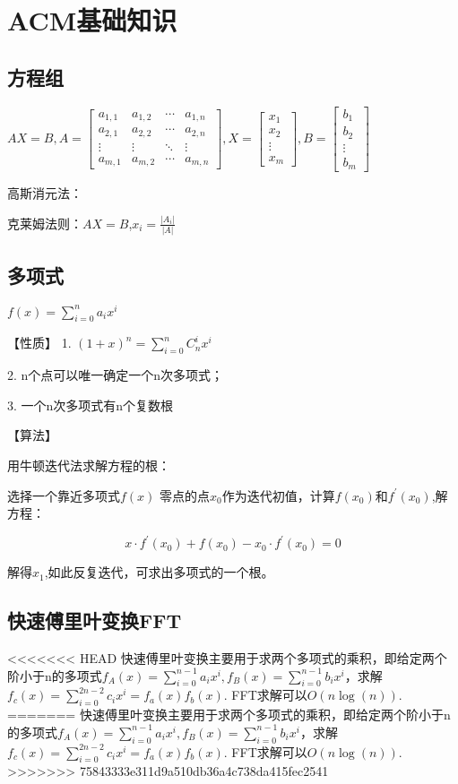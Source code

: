 \chapter{ACM基础知识}
\section{方程组}

$AX=B, A=\begin{bmatrix}
	a_{1,1} & a_{1,2} & \cdots & a_{1,n} \\
	a_{2,1} & a_{2,2} & \cdots & a_{2,n} \\
	\vdots  & \vdots  & \ddots & \vdots  \\
	a_{m,1} & a_{m,2} & \cdots & a_{m,n}
\end{bmatrix}, 
X=\begin{bmatrix}
x_{1}  \\
x_{2} \\
\vdots   \\
x_{m}
\end{bmatrix}, 
B=\begin{bmatrix}
b_{1}  \\
b_{2} \\
\vdots   \\
b_{m}
\end{bmatrix}$

高斯消元法：

克莱姆法则：$AX=B$,$x_i=\frac{|A_i|}{|A|}$

\section{多项式}
$f(x)=\sum_{i=0}^n{a_ix^i}$

【性质】
1. $(1+x)^n=\sum_{i=0}^n{C_n^ix^i}$

2. n个点可以唯一确定一个n次多项式；

3. 一个n次多项式有n个复数根

【算法】

用牛顿迭代法求解方程的根：

选择一个靠近多项式$f(x)$ 零点的点$x_0$作为迭代初值，计算$f(x_0)$和$f^{'}(x_0)$,解方程：

$$x\cdot f^{'}(x_0)+f(x_0)-x_0\cdot f^{'}(x_0)=0$$

解得$x_1$,如此反复迭代，可求出多项式的一个根。

\section{快速傅里叶变换FFT}
<<<<<<< HEAD
快速傅里叶变换主要用于求两个多项式的乘积，即给定两个阶小于n的多项式$f_{A}(x)=\sum_{i=0}^{n-1}{a_ix^i},f_{B}(x)=\sum_{i=0}^{n-1}{b_ix^i}$，求解$f_{c}(x)=\sum_{i=0}^{2n-2}{c_ix^i}=f_{a}(x)f_{b}(x)$.
 FFT求解可以$O(n\log(n))$.
=======
快速傅里叶变换主要用于求两个多项式的乘积，即给定两个阶小于n的多项式$f_{A}(x)=\sum_{i=0}^{n-1}{a_ix^i},f_{B}(x)=\sum_{i=0}^{n-1}{b_ix^i}$，求解$f_{c}(x)=\sum_{i=0}^{2n-2}{c_ix^i}=f_{a}(x)f_{b}(x)$. FFT求解可以$O(n\log(n))$.
>>>>>>> 75843333e311d9a510db36a4c738da415fec2541

